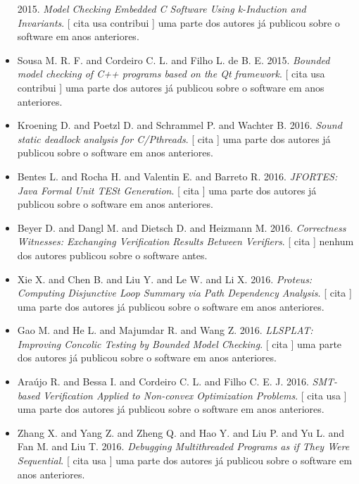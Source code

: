 \begin{itemize}
      2015.
        \textit{ Model Checking Embedded C Software Using k-Induction and Invariants}.
      [
          cita
          usa
          contribui
      ]
uma parte dos autores já publicou sobre o software em anos anteriores.
\item Sousa M. R. F. and Cordeiro C. L. and Filho L. de B. E.
      2015.
        \textit{ Bounded model checking of C++ programs based on the Qt framework}.
      [
          cita
          usa
          contribui
      ]
uma parte dos autores já publicou sobre o software em anos anteriores.
\item Kroening D. and Poetzl D. and Schrammel P. and Wachter B.
      2016.
        \textit{ Sound static deadlock analysis for C/Pthreads}.
      [
          cita
      ]
uma parte dos autores já publicou sobre o software em anos anteriores.
\item Bentes L. and Rocha H. and Valentin E. and Barreto R.
      2016.
        \textit{ JFORTES: Java Formal Unit TESt Generation}.
      [
          cita
      ]
uma parte dos autores já publicou sobre o software em anos anteriores.
\item Beyer D. and Dangl M. and Dietsch D. and Heizmann M.
      2016.
        \textit{ Correctness Witnesses: Exchanging Verification Results Between Verifiers}.
      [
          cita
      ]
nenhum dos autores publicou sobre o software antes.
\item Xie X. and Chen B. and Liu Y. and Le W. and Li X.
      2016.
        \textit{ Proteus: Computing Disjunctive Loop Summary via Path Dependency Analysis}.
      [
          cita
      ]
uma parte dos autores já publicou sobre o software em anos anteriores.
\item Gao M. and He L. and Majumdar R. and Wang Z.
      2016.
        \textit{ LLSPLAT: Improving Concolic Testing by Bounded Model Checking}.
      [
          cita
      ]
uma parte dos autores já publicou sobre o software em anos anteriores.
\item Araújo R. and Bessa I. and Cordeiro C. L. and Filho C. E. J.
      2016.
        \textit{ SMT-based Verification Applied to Non-convex Optimization Problems}.
      [
          cita
          usa
      ]
uma parte dos autores já publicou sobre o software em anos anteriores.
\item Zhang X. and Yang Z. and Zheng Q. and Hao Y. and Liu P. and Yu L. and Fan M. and Liu T.
      2016.
        \textit{ Debugging Multithreaded Programs as if They Were Sequential}.
      [
          cita
          usa
      ]
uma parte dos autores já publicou sobre o software em anos anteriores.

\end{itemize}
